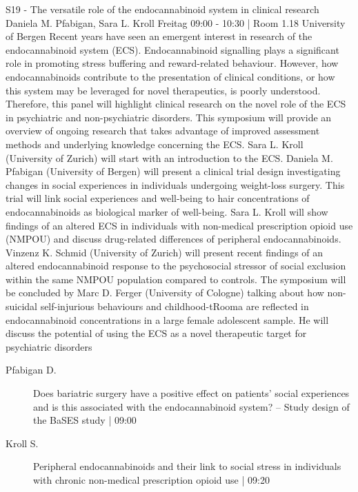 
            \begin{symposium}
            {S19 - The versatile role of the endocannabinoid system in clinical research}
            {Daniela M. Pfabigan, Sara L. Kroll}
            {Freitag 09:00 - 10:30 | Room 1.18}
            {University of Bergen}
            Recent years have seen an emergent interest in research of the endocannabinoid system (ECS). Endocannabinoid signalling plays a significant role in promoting stress buffering and reward-related behaviour. However, how endocannabinoids contribute to the presentation of clinical conditions, or how this system may be leveraged for novel therapeutics, is poorly understood. Therefore, this panel will highlight clinical research on the novel role of the ECS in psychiatric and non-psychiatric disorders.
This symposium will provide an overview of ongoing research that takes advantage of improved assessment methods and underlying knowledge concerning the ECS. Sara L. Kroll (University of Zurich) will start with an introduction to the ECS. Daniela M. Pfabigan (University of Bergen) will present a clinical trial design investigating changes in social experiences in individuals undergoing weight-loss surgery. This trial will link social experiences and well-being to hair concentrations of endocannabinoids as biological marker of well-being. Sara L. Kroll will show findings of an altered ECS in individuals with non-medical prescription opioid use (NMPOU) and discuss drug-related differences of peripheral endocannabinoids. Vinzenz K. Schmid (University of Zurich) will present recent findings of an altered endocannabinoid response to the psychosocial stressor of social exclusion within the same NMPOU population compared to controls. The symposium will be concluded by Marc D. Ferger (University of Cologne) talking about how non-suicidal self-injurious behaviours and childhood-tRooma are reflected in endocannabinoid concentrations in a large female adolescent sample. He will discuss the potential of using the ECS as a novel therapeutic target for psychiatric disorders
            \begin{description}    
            
                \item [ Pfabigan D.] Does bariatric surgery have a positive effect on patients’ social experiences and is this associated with the endocannabinoid system? – Study design of the BaSES study \textcolor{mygray}{ | 09:00}    
                
                \item [ Kroll S.] Peripheral endocannabinoids and their link to social stress in individuals with chronic non-medical prescription opioid use \textcolor{mygray}{ | 09:20}    
                

\end{description}
\end{symposium}
